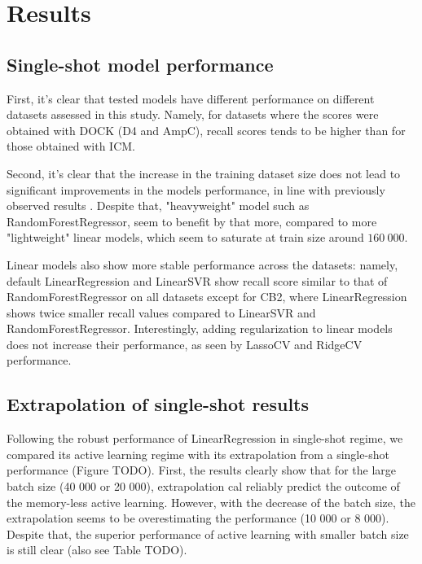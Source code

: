 \section{Results}

\subsection{Single-shot model performance}
\label{subsection:single-shot}


First, it's clear that tested models have different performance on different datasets assessed in this study. Namely, for datasets where the scores were obtained with DOCK (D4 and AmpC), recall scores tends to be higher than for those obtained with ICM.

Second, it's clear that the increase in the training dataset size does not lead to significant improvements in the models performance, in line with previously observed results \cite{Yang2021_shoichet_active_learning}. Despite that, "heavyweight" model such as RandomForestRegressor, seem to benefit by that more, compared to more "lightweight" linear models, which seem to saturate at train size around $160\ 000$.

Linear models also show more stable performance across the datasets: namely, default LinearRegression and LinearSVR show recall score similar to that of RandomForestRegressor on all datasets except for CB2, where LinearRegression shows twice smaller recall values compared to LinearSVR and RandomForestRegressor. Interestingly, adding regularization to linear models does not increase their performance, as seen by LassoCV and RidgeCV performance.

\subsection{Extrapolation of single-shot results}
Following the robust performance of LinearRegression in single-shot regime, we compared its active learning regime with its extrapolation from a single-shot performance (Figure TODO). First, the results clearly show that for the large batch size (40 000 or 20 000), extrapolation cal reliably predict the outcome of the memory-less active learning. However, with the decrease of the batch size, the extrapolation seems to be overestimating the performance (10 000 or 8 000). Despite that, the superior performance of active learning with smaller batch size is still clear (also see Table TODO). 

